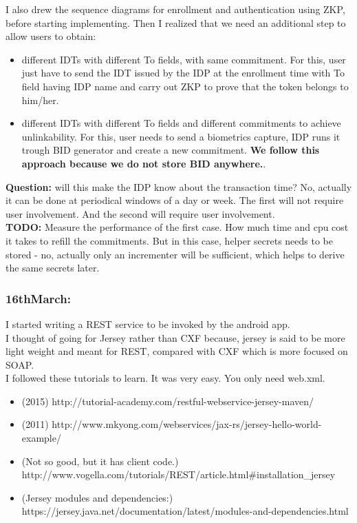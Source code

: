 \documentclass[11pt]{article}
\begin{document}
I also drew the sequence diagrams for enrollment and authentication using ZKP, before starting implementing. Then I realized that we need an 
additional step to allow users to obtain:\\
\begin{itemize}
 \item different IDTs with different To fields, with same commitment. For this, user just have to send the IDT issued by the IDP at the enrollment 
time with To field having IDP name and carry out ZKP to prove that the token belongs to him/her.
 \item different IDTs with different To fields and different commitments to achieve unlinkability. For this, user needs to send a biometrics capture, 
IDP runs it trough BID generator and create a new commitment. \textbf{We follow this approach because we do not store BID anywhere.}.
\end{itemize}

\textbf{Question:} will this make the IDP know about the transaction time? No, actually it can be done at periodical windows of a day or week. 
The first will not require user involvement. And the second will require user involvement.\\
\textbf{TODO:} Measure the performance of the first case. How much time and cpu cost it takes to refill the commitments. But in this case, helper 
secrets needs to be stored - no, actually only an incrementer will be sufficient, which helps to derive the same secrets later.

\subsubsection*{16thMarch:}
I started writing a REST service to be invoked by the android app. \\

I thought of going for Jersey rather than CXF because, jersey is said to be more light weight and meant for REST, compared with CXF which is more 
focused on SOAP.\\

I followed these tutorials to learn. It was very easy. You only need web.xml.\\
\begin{itemize}
 \item (2015) http://tutorial-academy.com/restful-webservice-jersey-maven/
 \item (2011) http://www.mkyong.com/webservices/jax-rs/jersey-hello-world-example/
 \item (Not so good, but it has client code.) http://www.vogella.com/tutorials/REST/article.html\#installation\_jersey
 \item (Jersey modules and dependencies:) https://jersey.java.net/documentation/latest/modules-and-dependencies.html
\end{itemize}
\end{document}
